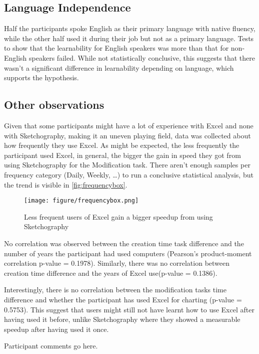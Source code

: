 \subsection{Language Independence}
Half the participants spoke English as their primary language with native fluency, while the other half used it during their job but not as a primary language. Tests to show that the learnability for English speakers was more than that for non-English speakers failed. While not statistically conclusive, this suggests that there wasn't a significant difference in learnability depending on language, which supports the hypothesis.

\subsection{Other observations}
Given that some participants might have a lot of experience with Excel and none with Sketchography, making it an uneven playing field, data was collected about how frequently they use Excel. As might be expected, the less frequently the participant used Excel, in general, the bigger the gain in speed they got from using Sketchography for the Modification task. There aren't enough samples per frequency category (Daily, Weekly, \ldots) to run a conclusive statistical analysis, but the trend is visible in \autoref{fig:frequencybox}.

\begin{figure}[H]
\begin{center}
\texttt{[image: figure/frequencybox.png]}
\end{center}
\caption{Less frequent users of Excel gain a bigger speedup from using Sketchography}
\label{fig:frequencybox}
\end{figure}




No correlation was observed between the creation time task difference and the number of years the participant had used computers (Pearson's product-moment correlation p-value = 0.1978). Similarly, there was no correlation between creation time difference and the years of Excel use(p-value = 0.1386).  

Interestingly, there is no correlation between the modification tasks time difference and whether the participant has used Excel for charting (p-value = 0.5753). This suggest that users might still not have learnt how to use Excel after having used it before, unlike Sketchography where they showed a measurable speedup after having used it once.

Participant comments go here.

